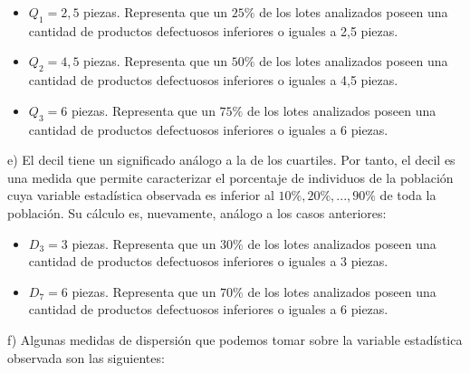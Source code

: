\begin{itemize}
	\item $Q_{1} = 2,5$ piezas. Representa que un $25\%$ de los lotes analizados poseen una cantidad de productos defectuosos inferiores o iguales a 2,5 piezas.
	
	\item $Q_{2} = 4,5$ piezas. Representa que un $50\%$ de los lotes analizados poseen una cantidad de productos defectuosos inferiores o iguales a 4,5 piezas.
	
	\item $Q_{3} = 6$ piezas. Representa que un $75\%$ de los lotes analizados poseen una cantidad de productos defectuosos inferiores o iguales a 6 piezas.
\end{itemize}

e) El decil tiene un significado análogo a la de los cuartiles. Por tanto, el decil es una medida que permite caracterizar el porcentaje de individuos de la población cuya variable estadística observada es inferior al $10\%, 20\%,..., 90\%$ de toda la población. Su cálculo es, nuevamente, análogo a los casos anteriores: 

\begin{itemize}
	\item $D_{3} = 3$ piezas. Representa que un $30\%$ de los lotes analizados poseen una cantidad de productos defectuosos inferiores o iguales a 3 piezas.
	
	\item $D_{7} = 6$ piezas. Representa que un $70\%$ de los lotes analizados poseen una cantidad de productos defectuosos inferiores o iguales a 6 piezas. \\
\end{itemize}


f) Algunas medidas de dispersión que podemos tomar sobre la variable estadística observada son las siguientes:

